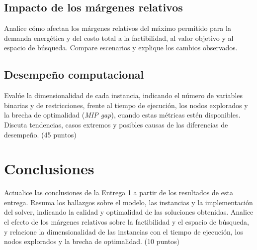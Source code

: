 \documentclass[journal, 12pt, onecolumn]{IEEEtran}
\begin{document}
\subsection{Impacto de los m\'argenes relativos}
Analice c\'omo afectan los m\'argenes relativos del m\'aximo permitido para la
demanda energ\'etica y del costo total a la factibilidad, al valor objetivo y al
espacio de b\'usqueda. Compare escenarios y explique los cambios observados.

\subsection{Desempe\~no computacional}
Eval\'ue la dimensionalidad de cada instancia, indicando el n\'umero de
variables binarias y de restricciones, frente al tiempo de ejecuci\'on, los
nodos explorados y la brecha de optimalidad (\textit{MIP gap}), cuando estas
m\'etricas est\'en disponibles. Discuta tendencias, casos extremos y posibles
causas de las diferencias de desempe\~no. (45 puntos)

\section{Conclusiones}
Actualice las conclusiones de la Entrega 1 a partir de los resultados de esta
entrega. Resuma los hallazgos sobre el modelo, las instancias y la
implementaci\'on del solver, indicando la calidad y optimalidad de las
soluciones obtenidas. Analice el efecto de los m\'argenes relativos sobre la
factibilidad y el espacio de b\'usqueda, y relacione la dimensionalidad de las
instancias con el tiempo de ejecuci\'on, los nodos explorados y la brecha de
optimalidad. (10 puntos)
\end{document}
